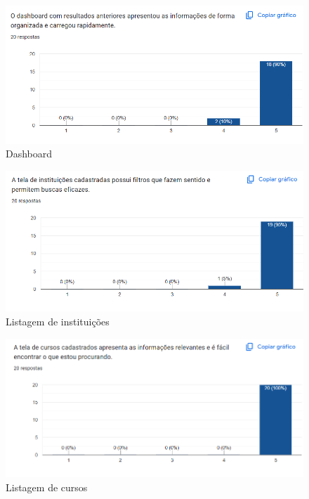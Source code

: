 \begin{apendicesenv}
\begin{figure}[H]
    \centering
    \includegraphics[width=1.0\linewidth]{images/resultadoAnterior.png}
    \caption{Dashboard}
    \label{fig:resultadoAnterior}
\end{figure}

\begin{figure}[H]
    \centering
    \includegraphics[width=1.0\linewidth]{images/instituicoes.png}
    \caption{Listagem de instituições}
    \label{fig:instituicoes}
\end{figure}

\begin{figure}[H]
    \centering
    \includegraphics[width=1.0\linewidth]{images/cursosListagem.png}
    \caption{Listagem de cursos}
    \label{fig:cursos}
\end{figure}


\end{apendicesenv}
